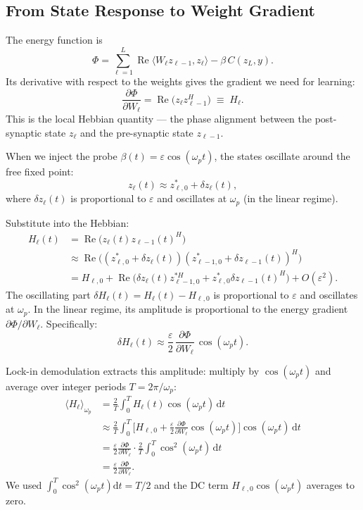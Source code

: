 \documentclass[11pt]{article}
\newcommand{\dd}{\mathrm{d}}
\DeclareMathOperator{\Real}{Re}
\begin{document}
\subsection{From State Response to Weight Gradient}\label{ssec:state-to-gradient}

The energy function is
\begin{equation}
\Phi = \sum_{\ell=1}^L \Real\langle W_\ell z_{\ell-1}, z_\ell \rangle - \beta\, C(z_L, y).
\end{equation}
Its derivative with respect to the weights gives the gradient we need for learning:
\begin{equation}
\frac{\partial \Phi}{\partial W_\ell} = \Real\big( z_\ell z_{\ell-1}^H \big) \;\equiv\; H_\ell.
\end{equation}
This is the local Hebbian quantity — the phase alignment between the post-synaptic state $z_\ell$ and the pre-synaptic state $z_{\ell-1}$.

When we inject the probe $\beta(t) = \varepsilon\cos(\omega_p t)$, the states oscillate around the free fixed point:
\begin{equation}
z_\ell(t) \approx z_{\ell,0}^* + \delta z_\ell(t),
\end{equation}
where $\delta z_\ell(t)$ is proportional to $\varepsilon$ and oscillates at $\omega_p$ (in the linear regime).

Substitute into the Hebbian:
\begin{align}
H_\ell(t) &= \Real\big( z_\ell(t) z_{\ell-1}(t)^H \big) \\
&\approx \Real\big( (z_{\ell,0}^* + \delta z_\ell(t)) (z_{\ell-1,0}^* + \delta z_{\ell-1}(t))^H \big) \\
&= H_{\ell,0} + \Real\big( \delta z_\ell(t) z_{\ell-1,0}^{*H} + z_{\ell,0}^* \delta z_{\ell-1}(t)^H \big) + O(\varepsilon^2).
\end{align}
The oscillating part $\delta H_\ell(t) = H_\ell(t) - H_{\ell,0}$ is proportional to $\varepsilon$ and oscillates at $\omega_p$. In the linear regime, its amplitude is proportional to the energy gradient $\partial\Phi/\partial W_\ell$. Specifically:
\begin{equation}
\delta H_\ell(t) \approx \frac{\varepsilon}{2}\,\frac{\partial \Phi}{\partial W_\ell}\,\cos(\omega_p t).
\end{equation}

Lock-in demodulation extracts this amplitude: multiply by $\cos(\omega_p t)$ and average over integer periods $T = 2\pi/\omega_p$:
\begin{align}
\langle H_\ell \rangle_{\omega_p}
&= \frac{2}{T}\int_0^T H_\ell(t) \cos(\omega_p t) \, \dd t \\
&\approx \frac{2}{T}\int_0^T \Big[ H_{\ell,0} + \frac{\varepsilon}{2}\frac{\partial \Phi}{\partial W_\ell}\cos(\omega_p t) \Big] \cos(\omega_p t) \, \dd t \\
&= \frac{\varepsilon}{2}\frac{\partial \Phi}{\partial W_\ell} \cdot \frac{2}{T}\int_0^T \cos^2(\omega_p t) \, \dd t \\
&= \frac{\varepsilon}{2}\frac{\partial \Phi}{\partial W_\ell}.
\end{align}
We used $\int_0^T \cos^2(\omega_p t) \dd t = T/2$ and the DC term $H_{\ell,0}\cos(\omega_p t)$ averages to zero.
\end{document}
